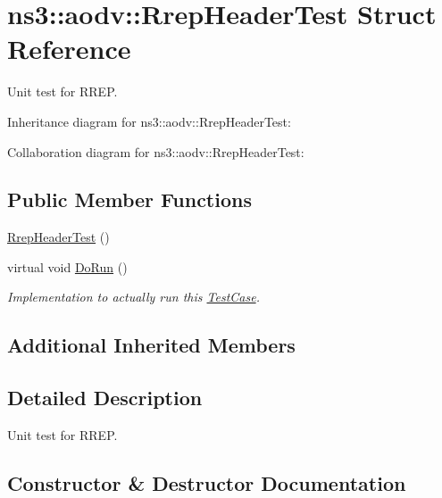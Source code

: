 \hypertarget{structns3_1_1aodv_1_1RrepHeaderTest}{}\section{ns3\+:\+:aodv\+:\+:Rrep\+Header\+Test Struct Reference}
\label{structns3_1_1aodv_1_1RrepHeaderTest}


Unit test for R\+R\+EP.  




Inheritance diagram for ns3\+:\+:aodv\+:\+:Rrep\+Header\+Test\+:


Collaboration diagram for ns3\+:\+:aodv\+:\+:Rrep\+Header\+Test\+:
\subsection*{Public Member Functions}
\begin{DoxyCompactItemize}
\item 
\hyperlink{structns3_1_1aodv_1_1RrepHeaderTest_ae2876623b7f949ba6f91c7443eaf4c8e}{Rrep\+Header\+Test} ()
\item 
virtual void \hyperlink{structns3_1_1aodv_1_1RrepHeaderTest_a738960399e10020c091c3b87085f16cd}{Do\+Run} ()
\begin{DoxyCompactList}\small\item\em Implementation to actually run this \hyperlink{classns3_1_1TestCase}{Test\+Case}. \end{DoxyCompactList}\end{DoxyCompactItemize}
\subsection*{Additional Inherited Members}


\subsection{Detailed Description}
Unit test for R\+R\+EP. 

\subsection{Constructor \& Destructor Documentation}
